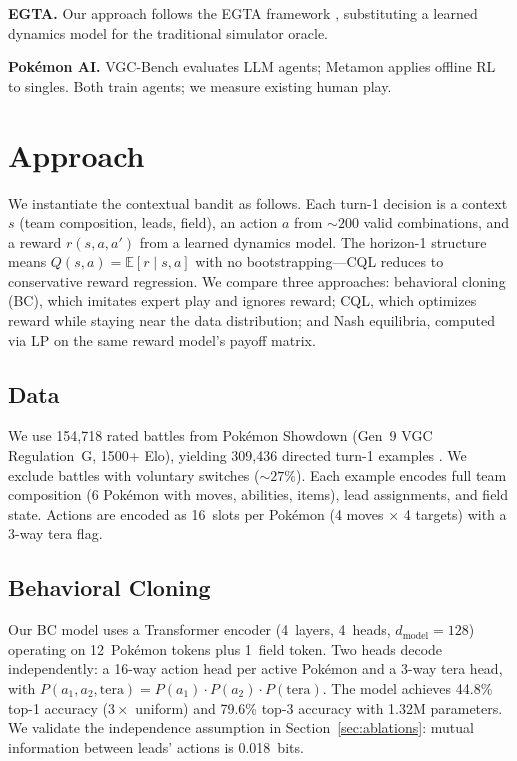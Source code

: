 \documentclass{article}
\begin{document}
\textbf{EGTA.}
Our approach follows the EGTA framework \citep{wellman2006methods}, substituting a learned dynamics model for the traditional simulator oracle.

\textbf{Pok\'emon AI.}
VGC-Bench \citep{angliss2025vgcbench} evaluates LLM agents; Metamon \citep{grigsby2025metamon} applies offline RL to singles. Both train agents; we measure existing human play.

\section{Approach}
\label{sec:approach}
We instantiate the contextual bandit as follows. Each turn-1 decision is a
context $s$ (team composition, leads, field), an action $a$ from
${\sim}200$ valid combinations, and a reward $r(s,a,a')$ from a learned
dynamics model. The horizon-1 structure means $Q(s,a) =
\mathbb{E}[r \mid s, a]$ with no bootstrapping---CQL reduces to
conservative reward regression. We compare three approaches: behavioral
cloning (BC), which imitates expert play and ignores reward; CQL, which
optimizes reward while staying near the data distribution; and Nash
equilibria, computed via LP on the same reward model's payoff matrix.

\subsection{Data}

We use 154,718 rated battles from Pok\'emon Showdown (Gen~9 VGC Regulation~G, 1500+ Elo), yielding 309,436 directed turn-1 examples \citep{brennan2026turnzero}. We exclude battles with voluntary switches (${\sim}27\%$). Each example encodes full team composition (6 Pok\'emon with moves, abilities, items), lead assignments, and field state. Actions are encoded as 16~slots per Pok\'emon (4 moves $\times$ 4 targets) with a 3-way tera flag.

\subsection{Behavioral Cloning}

Our BC model uses a Transformer encoder (4~layers, 4~heads, $d_\text{model} = 128$) operating on 12~Pok\'emon tokens plus 1~field token. Two heads decode independently: a 16-way action head per active Pok\'emon and a 3-way tera head, with $P(a_1, a_2, \text{tera}) = P(a_1) \cdot P(a_2) \cdot P(\text{tera})$. The model achieves 44.8\% top-1 accuracy ($3\times$ uniform) and 79.6\% top-3 accuracy with 1.32M parameters. We validate the independence assumption in Section~\ref{sec:ablations}: mutual information between leads' actions is 0.018~bits.
\end{document}
